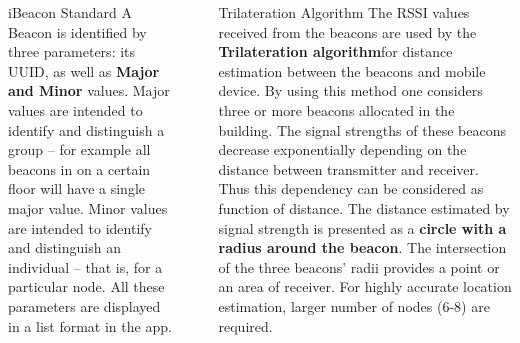 \documentclass[final]{beamer}
\newlength{\sepwid}
\newlength{\onecolwid}
\newlength{\twocolwid}
\begin{document}
\begin{frame}[t]
\begin{columns}[t]
\begin{column}{\twocolwid}
\begin{columns}[t,totalwidth=\twocolwid]
\begin{column}{\onecolwid}
\begin{block}{ iBeacon Standard}
A Beacon is identified by three parameters: its UUID, as well as \textbf{ Major and Minor} values.
Major values are intended to identify and distinguish a group – for example all beacons in on a certain floor will have a single major value.
Minor values are intended to identify and distinguish an individual – that is, for a particular node.
All these parameters are displayed in a list format in the app.

\end{block}


\end{column} %

\end{columns} %

\end{column} %

\begin{column}{\sepwid}\end{column} %

\begin{column}{\onecolwid} %


\begin{block}{Trilateration Algorithm}
  The RSSI values received from the beacons are used by the \textbf {Trilateration algorithm}for distance estimation between the beacons and mobile device. By using this method one considers three or more beacons allocated in the building. The signal strengths of these beacons decrease exponentially depending on the distance between transmitter and receiver. Thus this dependency can be considered as function of distance. The distance estimated by signal strength is presented as a \textbf{circle with a radius around the beacon}. The intersection of the three beacons' radii provides a point or an area of receiver. For highly accurate location estimation, larger number of nodes (6-8) are required.

\end{block}




\end{column}
\end{columns}
\end{frame}
\end{document}

